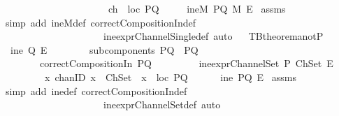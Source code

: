 \begin{isabellebody}
\ \ \ \ \ \ \ \ \ \ \ \ \ \ \ \ \ \ \ \ \ {\isasymand}\ {\isacharparenleft}ch\ {\isasymin}\ {\isacharparenleft}loc\ PQ{\isacharparenright}{\isacharparenright}{\isacharparenright}{\isachardoublequoteclose}\isanewline
{}\ \ \ \ {\isachardoublequoteopen}{\isasymnot}\ ineM\ PQ\ M\ E{\isachardoublequoteclose}\isanewline
%
\isadelimproof
%
\endisadelimproof
%
\isatagproof
{}\isamarkupfalse%
\ assms\isanewline
{}\isamarkupfalse%
\ {\isacharparenleft}simp\ add{\isacharcolon}\ ineM{\isacharunderscore}def\ correctCompositionIn{\isacharunderscore}def\ \isanewline
\ \ \ \ \ \ \ \ \ \ \ \ \ \ \ \ \ \ \ \ \ ine{\isacharunderscore}exprChannelSingle{\isacharunderscore}def{\isacharcomma}\ auto{\isacharparenright}%
\endisatagproof
{\isafoldproof}%
%
\isadelimproof
\ \isanewline
%
\endisadelimproof
\isanewline
{}\isamarkupfalse%
\ TBtheorem{}a{\isacharunderscore}notP{}{\isacharcolon}\isanewline
{}\ {\isachardoublequoteopen}{\isasymnot}\ ine\ Q\ E{\isachardoublequoteclose}\isanewline
\ \ \ \ \ \ \ \ {\isachardoublequoteopen}subcomponents\ PQ\ {\isacharequal}\ {\isacharbraceleft}P{\isacharcomma}Q{\isacharbraceright}{\isachardoublequoteclose}\isanewline
\ \ \ \ \ \ \ \ {\isachardoublequoteopen}correctCompositionIn\ PQ{\isachardoublequoteclose}\ \isanewline
\ \ \ \ \ \ \ \ {\isachardoublequoteopen}ine{\isacharunderscore}exprChannelSet\ P\ ChSet\ E{\isachardoublequoteclose}\isanewline
\ \ \ \ \ \ \ \ {\isachardoublequoteopen}{\isasymforall}\ {\isacharparenleft}x\ {\isacharcolon}{\isacharcolon}chanID{\isacharparenright}{\isachardot}\ {\isacharparenleft}{\isacharparenleft}x\ {\isasymin}\ ChSet{\isacharparenright}\ {\isasymlongrightarrow}\ {\isacharparenleft}x\ {\isasymin}\ {\isacharparenleft}loc\ PQ{\isacharparenright}{\isacharparenright}{\isacharparenright}{\isachardoublequoteclose}\ \isanewline
{}\ \ \ \ {\isachardoublequoteopen}{\isasymnot}\ ine\ PQ\ E{\isachardoublequoteclose}\isanewline
%
\isadelimproof
%
\endisadelimproof
%
\isatagproof
{}\isamarkupfalse%
\ assms\ \isanewline
{}\isamarkupfalse%
\ {\isacharparenleft}simp\ add{\isacharcolon}\ ine{\isacharunderscore}def\ correctCompositionIn{\isacharunderscore}def\ \isanewline
\ \ \ \ \ \ \ \ \ \ \ \ \ \ \ \ \ \ \ \ \ ine{\isacharunderscore}exprChannelSet{\isacharunderscore}def{\isacharcomma}\ auto{\isacharparenright}%
\endisatagproof
{\isafoldproof}%
%
\isadelimproof
\ \isanewline
%
\endisadelimproof
\isanewline
{}\isamarkupfalse%

\end{isabellebody}
